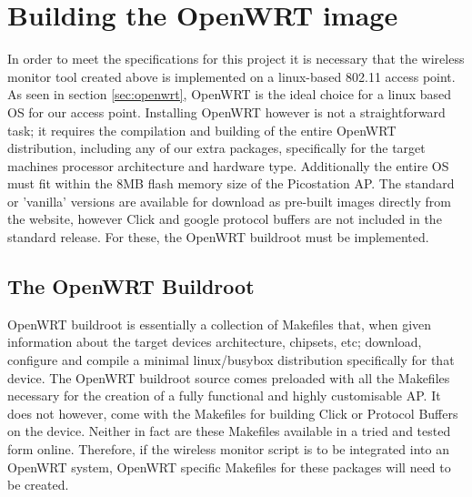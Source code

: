 % 
%  
% 
% 


\section{Building the OpenWRT image}
    In order to meet the specifications for this project it is necessary that the wireless monitor tool created above is implemented on a linux-based 802.11 access point. As seen in section \ref{sec:openwrt}, OpenWRT is the ideal choice for a linux based OS for our access point. Installing OpenWRT however is not a straightforward task; it requires the compilation and building of the entire OpenWRT distribution, including any of our extra packages, specifically for the target machines processor architecture and hardware type. Additionally the entire OS must fit within the 8MB flash memory size of the Picostation AP. The standard or 'vanilla' versions are available for download\cite{wrt-dl} as pre-built images directly from the website, however Click and google protocol buffers are not included in the standard release. For these, the OpenWRT buildroot must be implemented.

    \subsection{The OpenWRT Buildroot}
	OpenWRT buildroot is essentially a collection of Makefiles that, when given information about the target devices architecture, chipsets, etc; download, configure and compile a minimal linux/busybox distribution specifically for that device. The OpenWRT buildroot source comes preloaded with all the Makefiles necessary for the creation of a fully functional and highly customisable AP. It does not however, come with the Makefiles for building Click or Protocol Buffers on the device. Neither in fact are these Makefiles available in a tried and tested form online. Therefore, if the wireless monitor script is to be integrated into an OpenWRT system, OpenWRT specific Makefiles for these packages will need to be created. 

